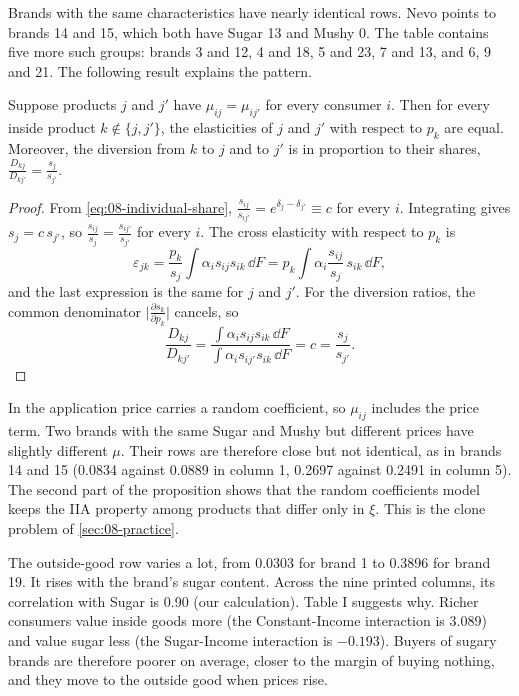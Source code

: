 Brands with the same characteristics have nearly identical rows. Nevo points to brands 14 and 15, which
both have Sugar 13 and Mushy 0. The table contains five more such groups: brands 3 and 12, 4 and 18, 5
and 23, 7 and 13, and 6, 9 and 21. The following result explains the pattern.

\begin{proposition}\label{prop:08-nevo00-identical}
Suppose products $j$ and $j'$ have $\mu_{ij}=\mu_{ij'}$ for every consumer $i$. Then for every inside product
$k\notin\{j,j'\}$, the elasticities of $j$ and $j'$ with respect to $p_k$ are equal. Moreover, the diversion from $k$ to $j$ and to $j'$ is in proportion to their shares,
$\frac{D_{kj}}{D_{kj'}}=\frac{s_j}{s_{j'}}$.
\end{proposition}

\begin{proof}
From \eqref{eq:08-individual-share}, $\frac{s_{ij}}{s_{ij'}}=e^{\delta_j-\delta_{j'}}\equiv c$ for every $i$.
Integrating gives $s_j=c\,s_{j'}$, so $\frac{s_{ij}}{s_j}=\frac{s_{ij'}}{s_{j'}}$ for every $i$. The cross
elasticity with respect to $p_k$ is
\begin{equation*}
\varepsilon_{jk}=\frac{p_k}{s_j}\int\alpha_is_{ij}s_{ik}\,\dd F
 =p_k\int\alpha_i\frac{s_{ij}}{s_j}\,s_{ik}\,\dd F ,
\end{equation*}
and the last expression is the same for $j$ and $j'$. For the diversion ratios,
the common denominator $\big|\frac{\partial s_k}{\partial p_k}\big|$ cancels, so
\begin{equation*}
\frac{D_{kj}}{D_{kj'}}=\frac{\int\alpha_is_{ij}s_{ik}\,\dd F}{\int\alpha_is_{ij'}s_{ik}\,\dd F}
 =c=\frac{s_j}{s_{j'}} .
\end{equation*}
\end{proof}

In the application price carries a random coefficient, so $\mu_{ij}$ includes the price term. Two brands
with the same Sugar and Mushy but different prices have slightly different $\mu$. Their rows are
therefore close but not identical, as in brands 14 and 15 (0.0834 against 0.0889 in column 1, 0.2697
against 0.2491 in column 5). The second part of the proposition shows that the random coefficients model
keeps the IIA property among products that differ only in $\xi$. This is the clone problem of
\cref{sec:08-practice}.

The outside-good row varies a lot, from 0.0303 for brand 1 to 0.3896 for brand 19. It rises with the
brand's sugar content. Across the nine printed columns, its correlation with Sugar is 0.90 (our
calculation). Table I suggests why. Richer consumers value inside goods more (the Constant-Income
interaction is 3.089) and value sugar less (the Sugar-Income interaction is $-0.193$). Buyers of sugary
brands are therefore poorer on average, closer to the margin of buying nothing, and they move to the
outside good when prices rise.

